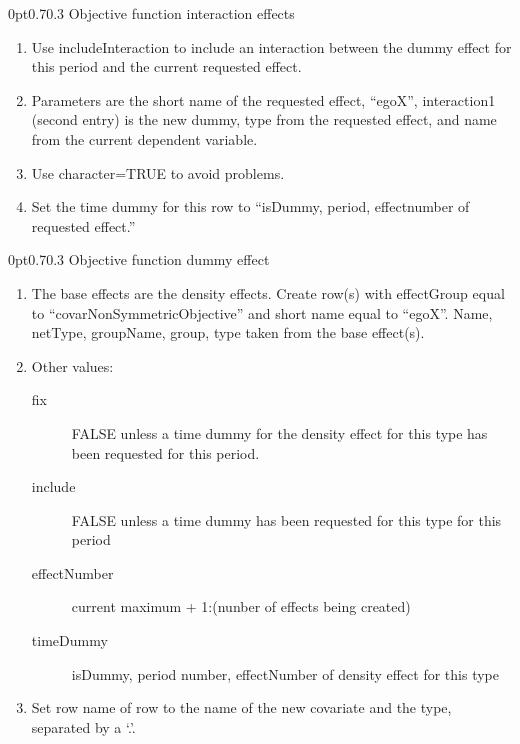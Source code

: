 \documentclass[12pt,a4paper]{article}
\makeatletter
\renewcommand{\=}{\,=\,}
\newcommand{\+}{\,+\,}
\renewcommand{\subsection}{\@startsection{subsection}{2}
                {0pt}{0.7\baselineskip}{0.3\baselineskip}
                {\sffamily} }
\makeatother
\begin{document}
\subsection{Objective function interaction effects}
\label{sec:objint}
\begin{enumerate}
\item Use includeInteraction to include an interaction between the dummy effect
for this period and the current requested effect.
\item Parameters are the short name of the requested effect, ``egoX'',
interaction1 (second entry) is the new dummy, type from the requested effect,
and name from the current dependent variable.
\item Use character=TRUE to avoid problems.
\item Set the time dummy for this row to ``isDummy, period, effectnumber of
requested effect.''
\end{enumerate}
\subsection{Objective function dummy effect}
\label{sec:nonrate}
\begin{enumerate}
\item The base effects are the density effects. Create row(s) with effectGroup
equal to ``covarNonSymmetricObjective'' and short name equal to ``egoX''. Name,
netType, groupName, group, type taken from the base effect(s).
\item Other values:
\begin{description}
\item[fix] FALSE unless a time dummy for the density effect for this type
has been requested for this period.
\item[include] FALSE unless a time dummy has been requested for this type for
  this period
\item[effectNumber] current maximum + 1:(nunber of effects being created)
\item[timeDummy] isDummy, period number, effectNumber of density effect for this
  type
\end{description}

\item Set row name of row to the name of the new covariate and the type,
  separated by a `.'.
\end{enumerate}
\end{document}
